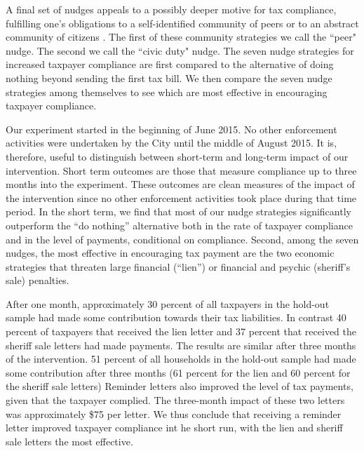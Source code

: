 \documentclass[12pt]{article}
\begin{document}
A final set of nudges appeals to a possibly deeper motive for tax
compliance, fulfilling one's obligations to a self-identified
community of peers \cite{Posner-00} or to an abstract community of
citizens \cite{Rawls-71}.  The first of these community strategies we
call the ``peer" nudge.  The second we call the ``civic duty" nudge.  
The seven nudge strategies for increased taxpayer compliance are first
compared to the alternative of doing nothing beyond sending the first
tax bill.  We then compare the seven nudge strategies among themselves
to see which are most effective in encouraging taxpayer compliance.

Our experiment started in the beginning of June 2015. No other enforcement
activities were undertaken by the City until the middle of August
2015. It is, therefore, useful to distinguish between short-term and
long-term impact of our intervention. Short term outcomes are those
that measure compliance up to three months into the experiment. These
outcomes are clean measures of the impact of the intervention since no
other enforcement activities took place during that time period.  In
the short term, we find that most of our nudge strategies
significantly outperform the ``do nothing'' alternative both in the
rate of taxpayer compliance and in the level of payments, conditional
on compliance.  Second, among the seven nudges, the most effective in
encouraging tax payment are the two economic strategies that threaten
large financial (``lien'') or financial and psychic (sheriff's sale)
penalties.

After one month, approximately 30 percent of all taxpayers in the
hold-out sample had made some contribution towards their tax
liabilities. In contrast 40 percent of taxpayers that received the
lien letter and 37 percent that received the sheriff sale letters had
made payments. The results are similar after three months of the
intervention.  51 percent of all households in the hold-out sample had
made some contribution after three months (61 percent for the lien and
60 percent for the sheriff sale letters) Reminder letters also
improved the level of tax payments, given that the taxpayer
complied. The three-month impact of these two letters was
approximately \$75 per letter. We thus conclude that receiving a
reminder letter improved taxpayer compliance int he short run, with
the lien and sheriff sale letters the most effective.
\end{document}
